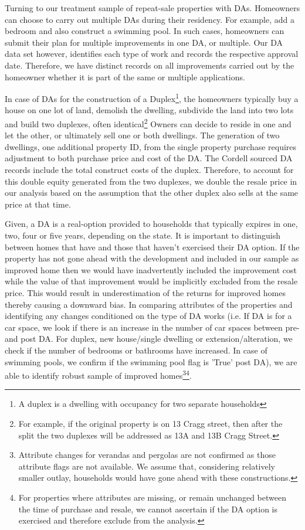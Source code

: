\documentclass[AEJ,reqno, draftmode]{AEA} %
\begin{document}
Turning to our treatment sample of repeat-sale properties with DAs. Homeowners can choose to carry out multiple DAs during their residency. For example, add a bedroom and also construct a swimming pool. In such cases, homeowners can submit their plan for multiple improvements in one DA, or multiple. Our DA data set however, identifies each type of work and records the respective approval date. Therefore, we have distinct records on all improvements carried out by the homeowner whether it is part of the same or multiple applications.

In case of DAs for the construction of a Duplex\footnote{A duplex is a dwelling with occupancy for two separate households}, the homeowners typically buy a house on one lot of land, demolish the dwelling, subdivide the land into two lots and build two duplexes, often identical\footnote{For example, if the original property is on 13 Cragg street, then after the split the two duplexes will be addressed as 13A and 13B Cragg Street.} Owners can decide to reside in one and let the other, or ultimately sell one or both dwellings. The generation of two dwellings, one additional property ID, from the single property purchase requires adjustment to both purchase price and cost of the DA. The Cordell sourced DA records include the total construct costs of the duplex. Therefore, to account for this double equity generated from the two duplexes, we double the resale price in our analysis based on the assumption that the other duplex also sells at the same price at that time. 

Given, a DA is a real-option provided to households that typically expires in one, two, four or five years, depending on the state. It is important to distinguish between homes that have and those that haven't exercised their DA option. If the property has not gone ahead with the development and included in our sample as improved home then we would have inadvertently included the improvement cost while the value of that improvement would be implicitly excluded from the resale price. This would result in underestimation of the returns for improved homes thereby causing a downward bias. In comparing attributes of the properties and identifying any changes conditioned on the type of DA works (i.e. If DA is for a car space, we look if there is an increase in the number of car spaces between pre- and post DA. For duplex, new house/single dwelling or extension/alteration, we check if the number of bedrooms or bathrooms have increased. In case of swimming pools, we confirm if the swimming pool flag is 'True' post DA), we are able to identify robust sample of improved homes\footnote{Attribute changes for verandas and pergolas are not confirmed as those attribute flags are not available. We assume that, considering relatively smaller outlay, households would have gone ahead with these constructions.}\footnote{For properties where attributes are missing, or remain unchanged between the time of purchase and resale, we cannot ascertain if the DA option is exercised and therefore exclude from the analysis.}.
\end{document}
